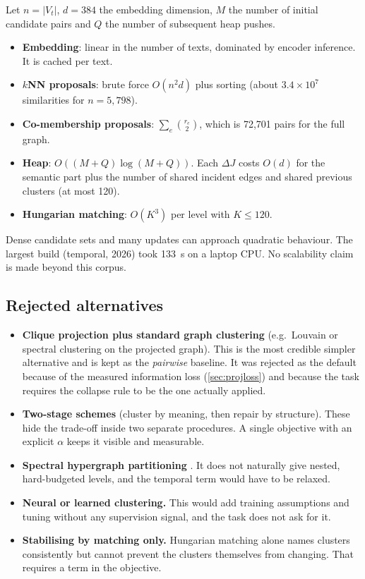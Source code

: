 \documentclass[11pt,a4paper]{article}
\newcommand{\cref}[1]{\autoref{#1}}
\theoremstyle{remark}
\begin{document}
Let $n=|V_t|$, $d=384$ the embedding dimension, $M$ the number of initial candidate pairs
and $Q$ the number of subsequent heap pushes.
\begin{itemize}
  \item \textbf{Embedding}: linear in the number of texts, dominated by encoder
        inference. It is cached per text.
  \item \textbf{$k$NN proposals}: brute force $O(n^2d)$ plus sorting (about $3.4\times10^7$
        similarities for $n=5{,}798$).
  \item \textbf{Co-membership proposals}: $\sum_e\binom{r_e}{2}$, which is 72{,}701 pairs
        for the full graph.
  \item \textbf{Heap}: $O((M+Q)\log(M+Q))$. Each $\Delta J$ costs $O(d)$ for the semantic
        part plus the number of shared incident edges and shared previous clusters (at most
        120).
  \item \textbf{Hungarian matching}: $O(K^3)$ per level with $K\le120$.
\end{itemize}
Dense candidate sets and many updates can approach quadratic behaviour. The largest
build (temporal, 2026) took 133~s on a laptop CPU. No scalability claim is made beyond
this corpus.

\subsection{Rejected alternatives}

\begin{itemize}
  \item \textbf{Clique projection plus standard graph clustering} (e.g.\ Louvain or
        spectral clustering on the projected graph). This is the most credible simpler
        alternative and is kept as the \emph{pairwise} baseline. It was rejected as the
        default because of the measured information loss (\cref{sec:projloss}) and
        because the task requires the collapse rule to be the one actually applied.
  \item \textbf{Two-stage schemes} (cluster by meaning, then repair by structure).
        These hide the trade-off inside two separate procedures. A single objective with
        an explicit $\alpha$ keeps it visible and measurable.
  \item \textbf{Spectral hypergraph partitioning} \citep{zhou2006hypergraph}. It does
        not naturally give nested, hard-budgeted levels, and the temporal term would have
        to be relaxed.
  \item \textbf{Neural or learned clustering.} This would add training assumptions and
        tuning without any supervision signal, and the task does not ask for it.
  \item \textbf{Stabilising by matching only.} Hungarian matching alone names clusters
        consistently but cannot prevent the clusters themselves from changing. That
        requires a term in the objective.
\end{itemize}
\end{document}
